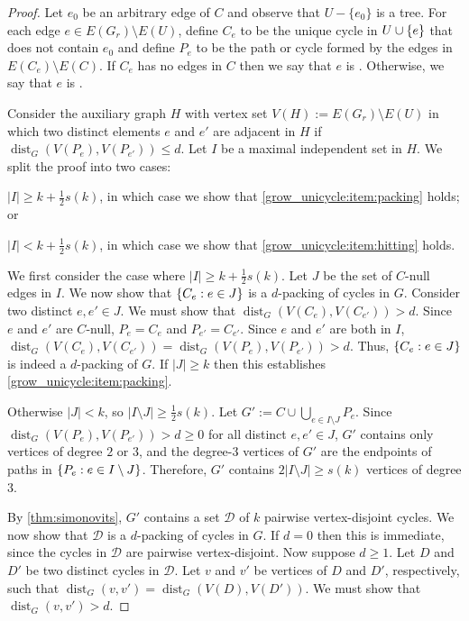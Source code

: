 \documentclass{patmorin}
\DeclareMathOperator{\dist}{dist}
\DeclarePairedDelimiter\set{\{}{\}}
\renewcommand{\mid}{:}  %
\begin{document}
\begin{proof}
  Let $e_0$ be an arbitrary edge of $C$ and observe that $U-\{e_0\}$ is a tree.  For each edge $e\in E(G_{r})\setminus E(U)$,  define $C_e$ to be the unique cycle in $U\cup \set{e}$ that does not contain $e_0$ and define $P_{e}$ to be the path or cycle formed by the edges in $E(C_{e})\setminus E(C)$. If $C_e$ has no edges in $C$ then we say that $e$ is . Otherwise, we say that $e$ is .

  Consider the auxiliary graph $H$ with vertex set $V(H):= E(G_{r})\setminus E(U)$ in which two distinct elements $e$ and $e'$ are adjacent in $H$ if $\dist_G(V(P_{e}),V(P_{e'})) \le d$.  Let $I$ be a maximal independent set in $H$. We split the proof into two cases:
  \begin{enumerate*}[label=\rm(\arabic*)]
    \item $|I|\ge k+\frac{1}{2}s(k)$, in which case we show that \cref{grow_unicycle:item:packing} holds; or
    \item $|I|< k+\frac{1}{2}s(k)$, in which case we show that \cref{grow_unicycle:item:hitting} holds.
  \end{enumerate*}

  We first consider the case where $|I|\ge k+\frac{1}{2}s(k)$.  Let $J$ be the set of $C$-null edges in $I$. We now show that $\set{C_e \mid e\in J}$ is a $d$-packing of cycles in $G$.  Consider two distinct $e,e'\in J$.  We must show that $\dist_G(V(C_e),V(C_{e'}))>d$. Since $e$ and $e'$ are $C$-null, $P_e=C_e$ and $P_{e'}=C_{e'}$. Since $e$ and $e'$ are both in $I$, $\dist_G(V(C_e),V(C_{e'}))=\dist_G(V(P_e),V(P_{e'}))>d$. Thus, $\set{C_e \mid e\in J}$ is indeed a $d$-packing of $G$.  If $|J|\ge k$ then this establishes \eqref{grow_unicycle:item:packing}.

  Otherwise $|J|<k$, so $|I\setminus J|\ge \tfrac{1}{2}s(k)$. Let $G':=C\cup\bigcup_{e\in I\setminus J} P_e$. Since $\dist_G(V(P_e),V(P_{e'}))>d\ge0$ for all distinct $e,e'\in J$, $G'$ contains only vertices of degree $2$ or $3$, and the degree-$3$ vertices of $G'$ are the endpoints of paths in $\set{P_e \mid e\in I\setminus J}$. Therefore, $G'$ contains $2|I\setminus J|\geq s(k)$ vertices of degree $3$.

  By \cref{thm:simonovits}, $G'$ contains a set $\mathcal{D}$ of $k$ pairwise vertex-disjoint cycles. We now show that $\mathcal{D}$ is a $d$-packing of cycles in $G$.  If $d=0$ then this is immediate, since the cycles in $\mathcal{D}$ are pairwise vertex-disjoint.  Now suppose $d\ge 1$. Let $D$ and $D'$ be two distinct cycles in $\mathcal{D}$. Let $v$ and $v'$ be vertices of $D$ and $D'$, respectively, such that $\dist_G(v,v')=\dist_G(V(D),V(D'))$.  We must show that $\dist_G(v,v')>d$.


\end{proof}
\end{document}
